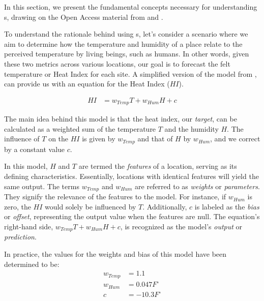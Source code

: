 \label{02_neural_networks}




In this section, we present the fundamental concepts necessary for understanding \neuralNetwork{}s, drawing on the Open Access material from  and .

\label{02_nn_motivating_example}


To understand the rationale behind using \neuralNetwork{}s, let's consider a scenario where we aim to determine how the temperature and humidity of a place relate to the perceived temperature by living beings, such as humans. In other words, given these two metrics across various locations, our goal is to forecast the felt temperature or Heat Index for each site. A simplified version of the model from , can provide us with an equation for the Heat Index ($HI$).

\begin{align*}
    HI &= w_{Temp} T + w_{Hum} H + c
\end{align*}


The main idea behind this model is that the heat index, our \emph{target}, can be calculated as a weighted sum of the temperature $T$ and the humidity $H$. The influence of $T$ on the $HI$ is given by $w_{Temp}$ and that of $H$ by $w_{Hum}$, and we correct by a constant value $c$. 

In this model, $H$ and $T$ are termed the \emph{features} of a location, serving as its defining characteristics. Essentially, locations with identical features will yield the same output. The terms $w_{Temp}$ and $w_{Hum}$ are referred to as \emph{weights} or \emph{parameters}. They signify the relevance of the features to the model. For instance, if $w_{Hum}$ is zero, the $HI$ would solely be influenced by $T$. Additionally, $c$ is labeled as the \emph{bias} or \emph{offset}, representing the output value when the features are null. The equation's right-hand side, $w_{Temp} T + w_{Hum} H + c$, is recognized as the model's \emph{output} or \emph{prediction}.


In practice, the values for the weights and bias of this model have been determined to be:
\begin{align*}
w_{Temp} & = 1.1\\
w_{Hum} &= 0.047 F^\circ \\
c &= -10.3 F^\circ
\end{align*}

